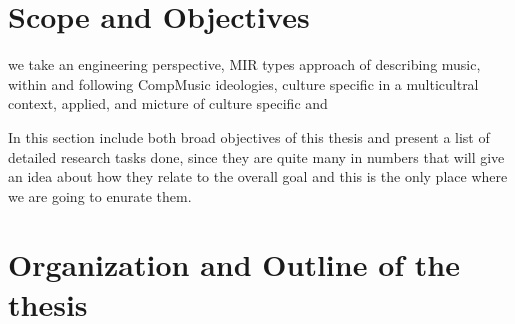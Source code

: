 \section{Scope and Objectives}
\label{sec:intro_scope_context_relevance}

we take an engineering perspective, MIR types approach of describing music, within and following CompMusic ideologies, culture specific in a multicultral context, applied, and micture of culture specific and 

In this section include both broad objectives of this thesis and present a list of detailed research tasks done, since they are quite many in numbers that will give an idea about how they relate to the overall goal and this is the only place where we are going to enurate them.

\section{Organization and Outline of the thesis}
\label{sec:intro_organization}
